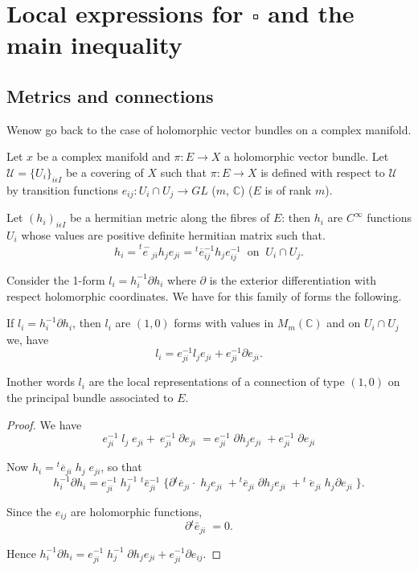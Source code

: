 \chapter{Local expressions for $\square$ and the main
  inequality}\label{chap3}%

\setcounter{section}{8}
\section{Metrics and connections}
 
We\pageoriginale now go back to the case of holomorphic vector bundles
on a complex manifold.  

Let $x$ be a complex manifold and $\pi: E \rightarrow X$ a
holomorphic vector bundle. Let $\mathcal{U}=\{U_i\}_{i\epsilon I}$ be
a covering of $X$ such that  $\pi: E \rightarrow X$ is defined with
respect to $\mathcal{U}$ by transition functions $e_{ij} : U_i\cap
U_j \rightarrow G L$  ($m$, $\mathbb{C}$) ($E$ is of rank $m$). 

Let $(h_i)_{i\epsilon I}$ be a hermitian metric along the fibres of $E$:
then $h_i$ are $C^\infty$ functions $U_i$ whose values are positive
definite hermitian matrix such that. 
$$
h_i=\overset{t-}{e}_{ji} h_j e_{ji} = {}^t \overline{e}_{ij}^{-1}
h_j e_{ij}^{-1} ~ \text{ on  } ~ U_i \cap U_j.
$$ 

Consider the 1-form $l_i = h^{-1}_{i}\partial {h_i}$ where
$\partial$ is the exterior differentiation with respect holomorphic
coordinates. We have for this family of forms the following. 

\setcounter{lemma}{0}
\begin{lemma}\label{chap3:lem3.1}%
  If $l_i= h^{-1}_{i} \partial {h_i}$, then $l_i$ are $(1,0)$ forms with
  values in $M_m (\mathbb{C} )$ and on $U_i\cap U_j$ we, have  
  $$  
  l_i=e^{-1}_{ji} l_j e_{ji}+e^{-1}_{ji} \partial
  e_{ji}.
  $$
\end{lemma}

In\pageoriginale other words $l_i$ are the local representations of a
connection of type $(1,0)$ on the principal bundle associated to $E$.   

\begin{proof}
  We have  
  $$
  e^{-1}_{ji} \; l_{j}\; e_{ji}+\: e^{-1}_{ji}\:
  \partial e_{ji}\; = e^{-1}_{ji}\; \partial h_j e_{ji}\;
  +e^{-1}_{ji}\; \partial e_{ji}
  $$

  Now $h_i= {}^t {\overline{e}}_{ji}  \; h_j \; e_{ji}$, so that 
  $$
  h^{-1}_{i}\partial h_i = e^{-1}_{ji}\;  h^{-1}_{j}\;
  {}^t \bar{e}_{ji}^{-1}\; \bigg\{\partial
 {}^t {\overline{e}}_{ji} \cdot \;   h_j e_{ji}\;
  + {}^t {\overline{e}}_{ji}\; \partial h_j e_{ji}\; + {}^t
   {\overline{\; e}}_{ji}\;  h_j\partial  e_{ji}\; \bigg\}.
  $$

Since the $e_{ij}$ are holomorphic functions,
  $$
  \partial {}^t{\bar{e}}_{ji}\; =0. 
  $$

  Hence \;  $h^{-1}_{i}\partial h_i = e^{-1}_{ji}\; h^{-1}_{j}\;
  \partial h_j e_{ji} + e^{-1}_{ji} \partial e_{ij}$. 
\end{proof}

